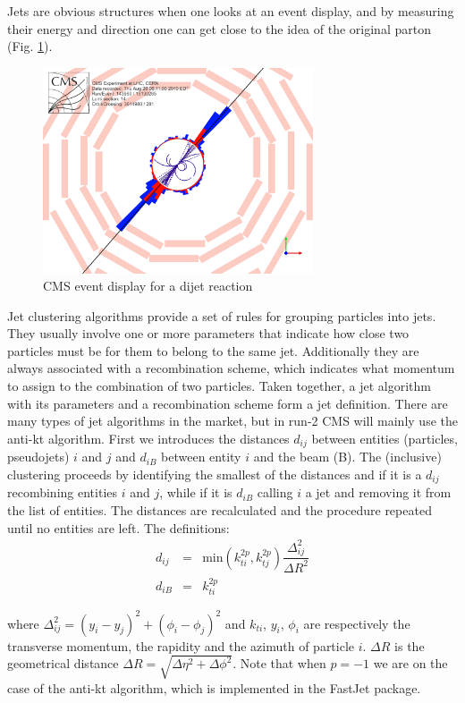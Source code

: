Jets are obvious structures when one looks at an event display, and by measuring their energy and direction one can get close to the idea of the original parton (Fig. \ref{jet2figure}).
\begin{figure}[H]
\caption{CMS event display for a dijet reaction \label{jet2figure}}
  \centering
\includegraphics[width=8cm]{physics_objects_plots/Jet2}
\end{figure}

Jet clustering algorithms provide a set of rules for grouping particles into jets. They usually involve one or more parameters that indicate how close two particles must be for them to belong to the same jet. Additionally they are always associated with a recombination scheme, which indicates what momentum to assign to the combination of two particles. Taken together, a jet algorithm with its parameters and a recombination scheme form a jet definition.
There are many types of jet algorithms in the market, but in run-2 CMS will mainly use the anti-kt algorithm. First we introduces the distances $d_{ij}$ between entities (particles, pseudojets) $i$ and $j$ and $d_{iB}$ between entity $i$ and the beam (B). The (inclusive) clustering proceeds by identifying the smallest of the distances and if it is a $d_{ij}$ recombining entities $i$ and $j$, while if it is $d_{iB}$ calling
$i$ a jet and removing it from the list of entities. The distances are recalculated and the procedure repeated until no entities are left. The definitions:
\begin{eqnarray}
d_{ij} &=& \text{min}\left(k^{2p}_{ti},k^{2p}_{tj} \right) \dfrac{\Delta^{2}_{ij}}{\Delta R^{2}}\\
d_{iB} &=& k^{2p}_{ti}
\end{eqnarray}

where $\Delta^{2}_{ij}= (y_{i}-y_{j})^{2}+(\phi_{i}-\phi_{j})^{2}$ and $k_{ti}$, $y_{i}$, $\phi_{i}$ are respectively the transverse momentum, the rapidity and the azimuth of particle $i$. $\Delta R$ is the geometrical distance $\Delta R=\sqrt{\Delta\eta^{2} + \Delta\phi^{2}}$. Note that when $p=-1$ we are on the case of  the anti-kt algorithm, which is implemented in the FastJet package.


